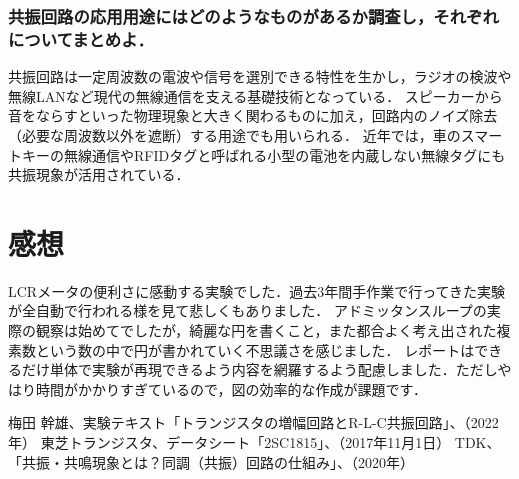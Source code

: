 \documentclass[dvipdfmx,titlepage,a4j]{jsarticle}  %
\numberwithin{equation}{section}
\begin{document}
\subsubsection{共振回路の応用用途にはどのようなものがあるか調査し，それぞれについてまとめよ．}
共振回路は一定周波数の電波や信号を選別できる特性を生かし，ラジオの検波や無線LANなど現代の無線通信を支える基礎技術となっている．
スピーカーから音をならすといった物理現象と大きく関わるものに加え，回路内のノイズ除去（必要な周波数以外を遮断）する用途でも用いられる．
近年では，車のスマートキーの無線通信やRFIDタグと呼ばれる小型の電池を内蔵しない無線タグにも共振現象が活用されている．

\section{感想}
LCRメータの便利さに感動する実験でした．過去3年間手作業で行ってきた実験が全自動で行われる様を見て悲しくもありました．
アドミッタンスループの実際の観察は始めてでしたが，綺麗な円を書くこと，また都合よく考え出された複素数という数の中で円が書かれていく不思議さを感じました．
レポートはできるだけ単体で実験が再現できるよう内容を網羅するよう配慮しました．ただしやはり時間がかかりすぎているので，図の効率的な作成が課題です．

\begin{thebibliography}{99}
   梅田 幹雄、実験テキスト「トランジスタの増幅回路とR-L-C共振回路」、（2022年）
   東芝トランジスタ、データシート「2SC1815」、（2017年11月1日）
  TDK、「共振・共鳴現象とは？同調（共振）回路の仕組み」、（2020年）
\end{thebibliography}
\end{document}
